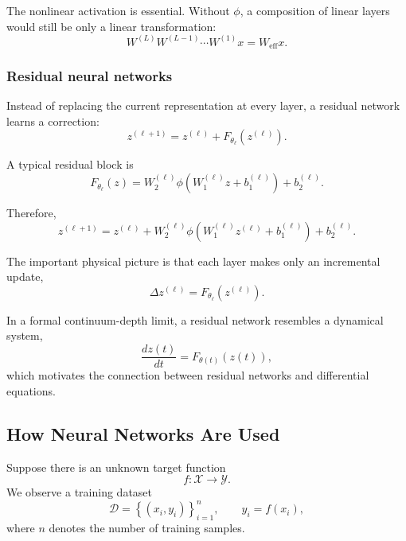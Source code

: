 The nonlinear activation is essential. Without $\phi$, a composition of linear
layers would still be only a linear transformation:
\begin{equation}
    W^{(L)}W^{(L-1)}\cdots W^{(1)}x
    =
    W_{\mathrm{eff}}x.
\end{equation}


\subsubsection{Residual neural networks}

Instead of replacing the current representation at every layer, a residual
network learns a correction:
\begin{equation}
    z^{(\ell+1)}
    =
    z^{(\ell)}
    +
    F_{\theta_\ell}\!\left(z^{(\ell)}\right).
\end{equation}

A typical residual block is
\begin{equation}
    F_{\theta_\ell}(z)
    =
    W_2^{(\ell)}
    \phi\!\left(
        W_1^{(\ell)}z+b_1^{(\ell)}
    \right)
    +
    b_2^{(\ell)}.
\end{equation}

Therefore,
\begin{equation}
    z^{(\ell+1)}
    =
    z^{(\ell)}
    +
    W_2^{(\ell)}
    \phi\!\left(
        W_1^{(\ell)}z^{(\ell)}
        +
        b_1^{(\ell)}
    \right)
    +
    b_2^{(\ell)}.
\end{equation}

The important physical picture is that each layer makes only an incremental
update,
\begin{equation}
    \Delta z^{(\ell)}
    =
    F_{\theta_\ell}(z^{(\ell)}).
\end{equation}

In a formal continuum-depth limit, a residual network resembles a dynamical
system,
\begin{equation}
    \frac{dz(t)}{dt}
    =
    F_{\theta(t)}(z(t)),
\end{equation}
which motivates the connection between residual networks and differential
equations.


\subsection{How Neural Networks Are Used}

Suppose there is an unknown target function
\begin{equation}
    f:\mathcal X\rightarrow\mathcal Y.
\end{equation}
We observe a training dataset
\begin{equation}
    \mathcal D
    =
    \left\{
    (x_i,y_i)
    \right\}_{i=1}^{n},
    \qquad
    y_i=f(x_i),
\end{equation}
where $n$ denotes the number of training samples.

